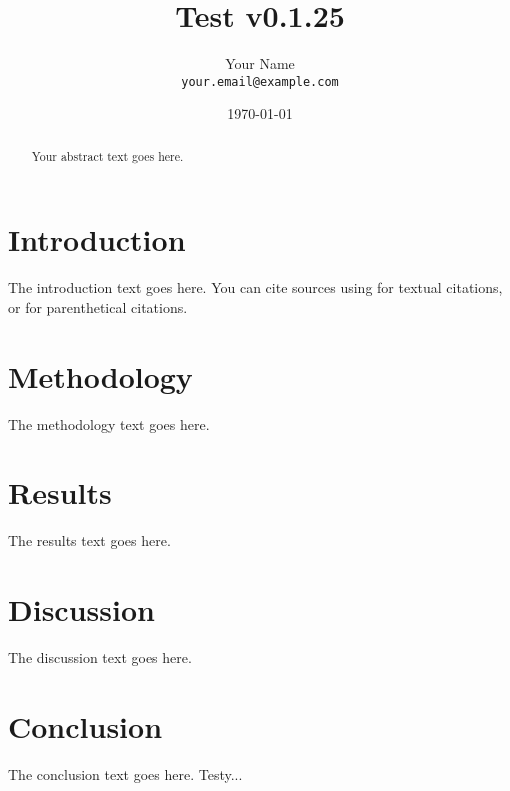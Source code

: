 \documentclass[12pt]{article}
\title{Test v0.1.25}
\author{Your Name \\ \texttt{your.email@example.com}}
\date{\today}
\begin{document}
\maketitle

\begin{abstract}
Your abstract text goes here.
\end{abstract}

\section*{Introduction}
The introduction text goes here. You can cite sources using \textcite{RindCmplxtyAndClmt1999} for textual citations, or \parencite{RindCmplxtyAndClmt1999} for parenthetical citations.

\section*{Methodology}
The methodology text goes here.

\section*{Results}
The results text goes here.

\section*{Discussion}
The discussion text goes here.

\section*{Conclusion}
The conclusion text goes here. Testy...

\printbibliography
\end{document}
